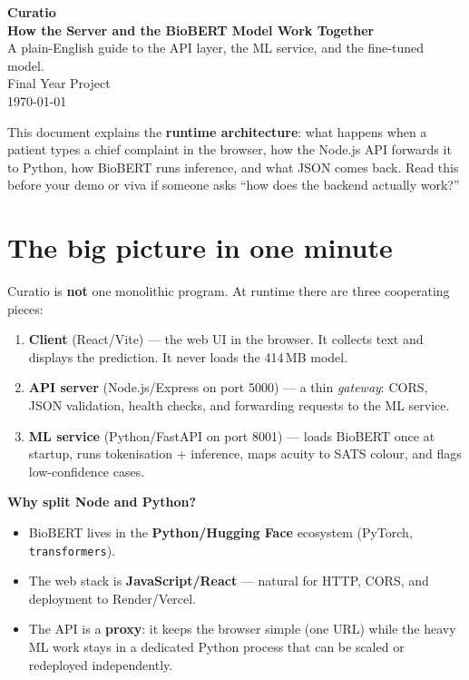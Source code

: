 \documentclass[11pt]{article}
\begin{document}
\begin{titlepage}
\centering
\vspace*{3cm}
{\Huge\bfseries\color{forest} Curatio}\\[0.4cm]
{\LARGE\bfseries How the Server and the BioBERT Model Work Together}\\[1cm]
{\large A plain-English guide to the API layer, the ML service, and the fine-tuned model.}\\[2cm]
{\large Final Year Project}\\[0.3cm]
{\large \today}\\[2cm]
\begin{tcolorbox}[width=0.88\textwidth, colback=sand, colframe=forest, arc=4pt]
\small\centering
This document explains the \textbf{runtime architecture}: what happens when a patient types a chief
complaint in the browser, how the Node.js API forwards it to Python, how BioBERT runs inference,
and what JSON comes back. Read this before your demo or viva if someone asks ``how does the backend
actually work?''
\end{tcolorbox}
\end{titlepage}

\tableofcontents
\newpage

\section{The big picture in one minute}

Curatio is \textbf{not} one monolithic program. At runtime there are three cooperating pieces:

\begin{enumerate}
  \item \textbf{Client} (React/Vite) --- the web UI in the browser. It collects text and displays
        the prediction. It never loads the 414\,MB model.
  \item \textbf{API server} (Node.js/Express on port 5000) --- a thin \emph{gateway}: CORS,
        JSON validation, health checks, and forwarding requests to the ML service.
  \item \textbf{ML service} (Python/FastAPI on port 8001) --- loads BioBERT once at startup, runs
        tokenisation + inference, maps acuity to SATS colour, and flags low-confidence cases.
\end{enumerate}

\begin{idea}
\textbf{Why split Node and Python?}
\begin{itemize}
  \item BioBERT lives in the \textbf{Python/Hugging Face} ecosystem (PyTorch, \texttt{transformers}).
  \item The web stack is \textbf{JavaScript/React} --- natural for HTTP, CORS, and deployment to
        Render/Vercel.
  \item The API is a \textbf{proxy}: it keeps the browser simple (one URL) while the heavy ML work
        stays in a dedicated Python process that can be scaled or redeployed independently.
\end{itemize}
\end{idea}
\end{document}
